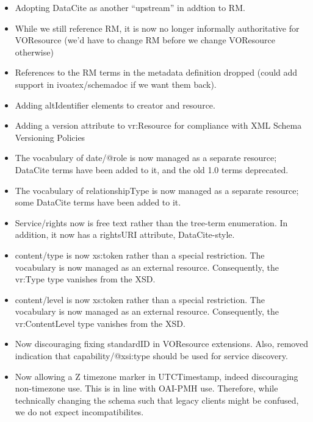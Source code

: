 \documentclass[11pt,a4paper]{ivoa}
\begin{document}
\begin{itemize}
\item Adopting DataCite as another ``upstream'' in addtion to RM.

\item While we still reference RM, it is now no longer informally
authoritative for VOResource (we'd have to change RM before we change
VOResource otherwise)

\item References to the RM terms in the metadata definition dropped
(could add support in ivoatex/schemadoc if we want them back).


\item Adding altIdentifier elements to creator and resource.

\item Adding a version attribute to vr:Resource for compliance with XML
Schema Versioning Policies

\item The vocabulary of date/@role is now managed as a separate
resource; DataCite terms have been added to it, and the old 1.0 terms
deprecated.

\item The vocabulary of relationshipType is now managed as a separate
resource; some DataCite terms have been added to it.

\item Service/rights now is free text rather than the tree-term
enumeration.  In addition, it now has a rightsURI attribute,
DataCite-style.

\item content/type is now xs:token rather than a special restriction.
The vocabulary is now managed as an external resource.
Consequently, the vr:Type type vanishes from the XSD.

\item content/level is now xs:token rather than a special restriction.
The vocabulary is now managed as an external resource.
Consequently, the vr:ContentLevel type vanishes from the XSD.

\item Now discouraging fixing standardID in VOResource extensions.
Also, removed indication that capability/@xsi:type should be used for
service discovery.

\item Now allowing a Z timezone marker in UTCTimestamp, indeed
discouraging non-timezone use.  This is in line with OAI-PMH use.
Therefore, while technically changing the schema such that legacy
clients  might be confused, we do not expect incompatibilites.


\end{itemize}
\end{document}
